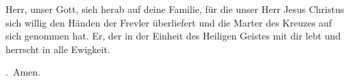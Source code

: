 \lettrine[lines=3]{H}{}err, unser Gott, sieh herab auf deine Familie, für die unser Herr Jesus Christus sich willig den Händen der Frevler überliefert und die Marter des Kreuzes auf sich genommen hat. Er, der in der Einheit des Heiligen Geistes mit dir lebt und herrscht in alle Ewigkeit.
\par \Rbar.~Amen.
